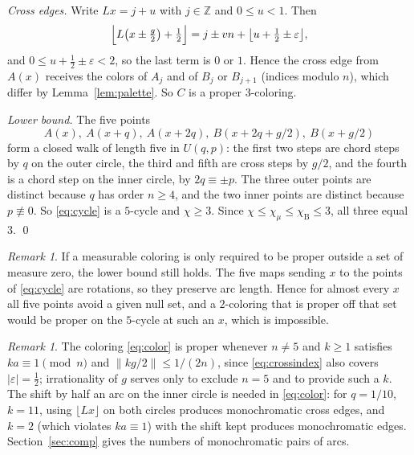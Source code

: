 \documentclass[11pt]{amsart}
\theoremstyle{remark}
\newtheorem{remark}[theorem]{Remark}
\numberwithin{equation}{section}
\newcommand{\Z}{\mathbb{Z}}
\newcommand{\chiB}{\chi_{\mathrm B}}
\newcommand{\chiM}{\chi_{\mu}}
\begin{document}
\emph{Cross edges.} Write $Lx=j+u$ with $j\in\Z$ and $0\le u<1$. Then
\begin{equation}\label{eq:crossindex}
\Bigl\lfloor L\bigl(x\pm \tfrac g2\bigr)+\tfrac12\Bigr\rfloor
=j\pm vn+\bigl\lfloor u+\tfrac12\pm\varepsilon\bigr\rfloor ,
\end{equation}
and $0\le u+\frac12\pm\varepsilon<2$, so the last term is $0$ or $1$.
Hence the cross edge from $A(x)$ receives the colors of $A_j$ and of
$B_j$ or $B_{j+1}$ (indices modulo $n$), which differ by
Lemma~\ref{lem:palette}. So $C$ is a proper $3$-coloring.

\emph{Lower bound.} The five points
\begin{equation}\label{eq:cycle}
A(x),\ A(x+q),\ A(x+2q),\ B(x+2q+g/2),\ B(x+g/2)
\end{equation}
form a closed walk of length five in $U(q,p)$: the first two steps are
chord steps by $q$ on the outer circle, the third and fifth are cross
steps by $g/2$, and the fourth is a chord step on the inner circle, by
$2q\equiv\pm p$. The three outer points
are distinct because $q$ has order $n\ge4$, and the two inner points
are distinct because $p\not\equiv0$. So \eqref{eq:cycle} is a $5$-cycle
and $\chi\ge3$. Since $\chi\le\chiM\le\chiB\le3$, all three equal $3$.
\qed

\begin{remark}\label{rem:null}
If a measurable coloring is only required to be proper outside a set of
measure zero, the lower bound still holds. The five maps sending $x$ to
the points of \eqref{eq:cycle} are rotations, so they preserve arc length.
Hence for almost every $x$ all five points avoid a given null set, and a
$2$-coloring that is proper off that set would be proper on the
$5$-cycle at such an $x$, which is impossible.
\end{remark}

\begin{remark}\label{rem:hyp}
The coloring \eqref{eq:color} is proper whenever $n\ne5$ and $k\ge1$
satisfies $ka\equiv1\pmod n$ and $\|kg/2\|\le1/(2n)$, since
\eqref{eq:crossindex} also covers $|\varepsilon|=\frac12$; irrationality
of $g$ serves only to exclude $n=5$ and to provide such a $k$. The shift by
half an arc on the inner circle is needed in \eqref{eq:color}: for
$q=1/10$, $k=11$, using $\lfloor Lx\rfloor$ on both circles produces
monochromatic cross edges, and $k=2$ (which violates $ka\equiv1$) with
the shift kept produces monochromatic edges. Section~\ref{sec:comp} gives the
numbers of monochromatic pairs of arcs.
\end{remark}
\end{document}
